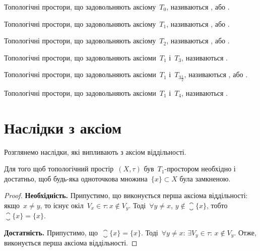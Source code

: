\begin{definition}[Колмогоров, 1935]
    Топологічні простори, що задовольняють аксіому~$T_0$, називаються , або .
\end{definition}

\begin{definition}[Рісс, 1907]
    Топологічні простори, що задовольняють аксіому~$T_1$, називаються , або .
\end{definition}

\begin{definition}[Хаусдорф, 1914]
    Топологічні простори, що задовольняють аксіому~$T_2$, називаються , або .
\end{definition}

\begin{definition}[В'єторіс, 1921]
    Топологічні простори, що задовольняють аксіоми~$T_1$ і~$T_3$, називаються .
\end{definition}

\begin{definition}[Тихонов, 1930]
    Топологічні простори, що задовольняють аксіоми~$T_1$ і~$T_{3\frac{1}{2}}$, називаються , або .
\end{definition}

\begin{definition}
    Топологічні простори, що задовольняють аксіоми~$T_1$ і~$T_4$, називаються .
\end{definition}

\section{Наслідки з аксіом}

Розглянемо наслідки, які випливають з аксіом віддільності.

\begin{theorem}
    Для того щоб топологічний простір~$(X, \tau)$ був~$T_1$-простором необхідно і достатньо, щоб будь-яка одноточкова множина~$\{x\} \subset X$ була замкненою.
\end{theorem}

\begin{proof}
    \textbf{Необхідність.} Припустимо, що виконується перша аксіома віддільності: якщо~$x \ne y$, то існує окіл~$V_x \in \tau: x \notin V_y$. Тоді~$\forall y \ne x$, $y \notin \closure{\{x\}}$, тобто~$\closure{\{x\}} = \{x\}$.

    \textbf{Достатність.} Припустимо, що~$\closure{\{x\}} = \{x\}$. Тоді~$\forall y \ne x$: $\exists V_y \in \tau$: $x \notin V_y$. Отже, виконується перша аксіома віддільності.
\end{proof}

